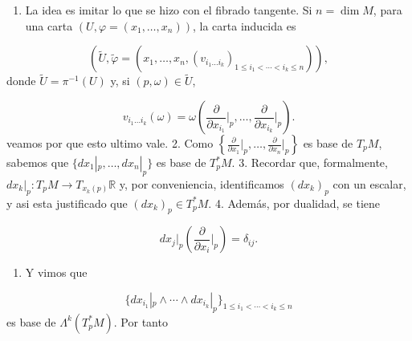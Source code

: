 \begin{bookproof}{}
\begin{enumerate}
\item La idea es imitar lo que se hizo con el fibrado tangente. Si $n=\dim M$, para una carta $(U,\varphi=(x_1,\ldots,x_n))$, la carta inducida es
\end{enumerate}
\[
(\widetilde U,\widetilde\varphi=(x_1,\ldots,x_n,(v_{i_1\ldots i_k})_{1\le i_1<\cdots<i_k\le n})),
\]
donde $\widetilde U=\pi^{-1}(U)$ y, si $(p,\omega)\in\widetilde U$,

\[
v_{i_1\ldots i_k}(\omega)=\omega\left(\frac{\partial}{\partial x_{i_1}}\bigg|_p,\ldots,\frac{\partial}{\partial x_{i_k}}\bigg|_p\right).
\]
veamos por que esto ultimo vale. 2. Como $\left\{\frac{\partial}{\partial x_1}\big|_p,\ldots,\frac{\partial}{\partial x_n}\big|_p\right\}$ es base de $T_pM$, sabemos que $\{dx_1|_p,\ldots,dx_n|_p\}$ es base de $T_p^*M$. 3. Recordar que, formalmente, $dx_k|_p:T_pM\to T_{x_k(p)}\mathbb R$ y, por conveniencia, identificamos $(dx_k)_p$ con un escalar, y asi esta justificado que $(dx_k)_p\in T_p^*M$. 4. Además, por dualidad, se tiene

\[
dx_j|_p\left(\frac{\partial}{\partial x_i}\bigg|_p\right)=\delta_{ij}.
\]
\begin{enumerate}[start=5]
\item Y vimos que
\end{enumerate}
\[
\{dx_{i_1}|_p\wedge\cdots\wedge dx_{i_k}|_p\}_{1\le i_1<\cdots<i_k\le n}
\]
es base de $\Lambda^k(T_p^*M)$. Por tanto


\end{bookproof}
